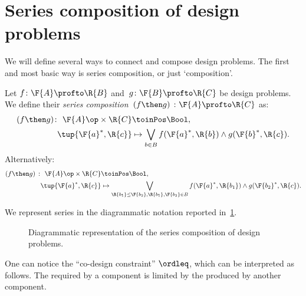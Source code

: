 \section{Series composition of design problems}

We will define several ways to connect and compose design problems. The first and most basic way is series composition, or just `composition'.

\begin{definition}
  \label{def:dp-series}
  Let $f \colon  \F{A} \profto \R{B}$ and~$g \colon \F{B} \profto \R{C}$ be design problems. We define their \emph{series composition}~$(f\then g)\ \colon  \F{A} \profto \R{C}$ as:
  \begin{equation}
    \label{eq:composition2}
    \begin{aligned}
    (f \then g) %
      \colon \ \F{A}\op \times \R{C} & \toinPos  \Bool, \\
      \tup{\F{a}^*, \R{c}} &\mapsto \bigvee_{b\in B} f(\F{a}^*,\R{b}) \wedge g(\F{b}^*,\R{c}).
    \end{aligned}
  \end{equation}
  Alternatively:
  \begin{equation}
    \begin{aligned}
      \label{eq:composition}
      (f \then g)\  \colon \ \F{A}\op \times \R{C} & \toinPos  \Bool,  \\
      \tup{\F{a}^*, \R{c}} &\mapsto \bigvee_{\R{b_1}\leq\F{b_2}, \R{b_1},\F{b_2}\in B} f(\F{a}^*,\R{b_1}) \wedge g(\F{b_2}^*,\R{c}).
    \end{aligned}
  \end{equation}
\end{definition}
We represent series in the diagrammatic notation reported in~\cref{fig:compositiondiagram}.


\begin{figure}[h!]
  \begin{center}
  \end{center}
  \caption{Diagrammatic representation of the series composition of design problems. \label{fig:compositiondiagram}}
\end{figure}

One can notice the ``co-design constraint'' $\ordleq$, which can be interpreted as follows. The  required by a component is limited by the  produced by another component.

